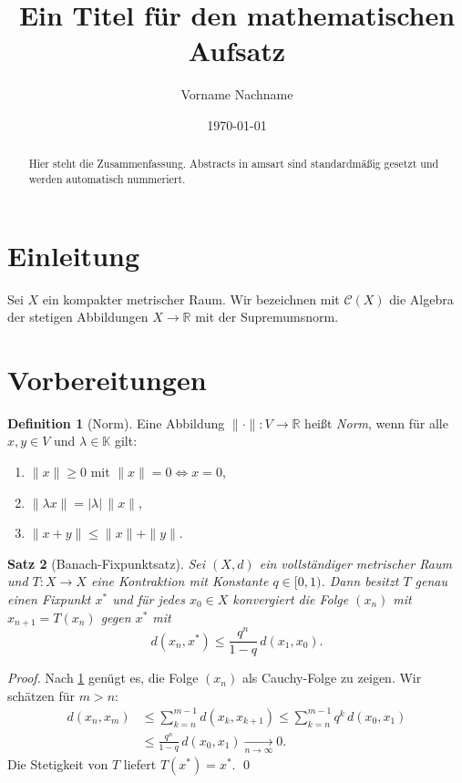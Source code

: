\documentclass[11pt,reqno]{amsart}
\title{Ein Titel für den mathematischen Aufsatz}
\author{Vorname Nachname}
\date{\today}
\newtheorem{theorem}{Satz}[section]
\theoremstyle{definition}
\newtheorem{definition}[theorem]{Definition}
\theoremstyle{remark}
\numberwithin{equation}{section}
\begin{document}
\begin{abstract}
  Hier steht die Zusammenfassung. Abstracts in \textsf{amsart} sind
  standardmäßig gesetzt und werden automatisch nummeriert.
\end{abstract}

\maketitle

\section{Einleitung}
\label{sec:einleitung}

Sei $X$ ein kompakter metrischer Raum. Wir bezeichnen mit
$\mathcal{C}(X)$ die Algebra der stetigen Abbildungen $X \to \mathbb{R}$
mit der Supremumsnorm.

\section{Vorbereitungen}
\label{sec:vorarbeit}

\begin{definition}[Norm]
  \label{def:norm}
  Eine Abbildung $\|\cdot\| : V \to \mathbb{R}$ heißt \emph{Norm}, wenn für alle
  $x,y \in V$ und $\lambda \in \mathbb{K}$ gilt:
  \begin{enumerate}
    \item $\|x\| \ge 0$ mit $\|x\| = 0 \Leftrightarrow x = 0$,
    \item $\|\lambda x\| = |\lambda|\,\|x\|$,
    \item $\|x + y\| \le \|x\| + \|y\|$.
  \end{enumerate}
\end{definition}

\begin{theorem}[Banach-Fixpunktsatz]
  \label{thm:banach}
  Sei $(X,d)$ ein vollständiger metrischer Raum und $T : X \to X$ eine
  Kontraktion mit Konstante $q \in [0,1)$. Dann besitzt $T$ genau einen
  Fixpunkt $x^\ast$ und für jedes $x_0 \in X$ konvergiert die Folge
  $(x_n)$ mit $x_{n+1} = T(x_n)$ gegen $x^\ast$ mit
  \begin{equation}
    \label{eq:konvergenz}
    d(x_n, x^\ast) \le \frac{q^n}{1-q}\, d(x_1, x_0).
  \end{equation}
\end{theorem}

\begin{proof}
  Nach \cref{def:norm} genügt es, die Folge $(x_n)$ als Cauchy-Folge zu
  zeigen. Wir schätzen für $m > n$:
  \begin{align*}
    d(x_n, x_m) &\le \sum_{k=n}^{m-1} d(x_k, x_{k+1})
                 \le \sum_{k=n}^{m-1} q^k\, d(x_0, x_1) \\
                &\le \frac{q^n}{1-q}\, d(x_0, x_1) \xrightarrow[n\to\infty]{} 0.
  \end{align*}
  Die Stetigkeit von $T$ liefert $T(x^\ast) = x^\ast$. \qed
\end{proof}
\end{document}
